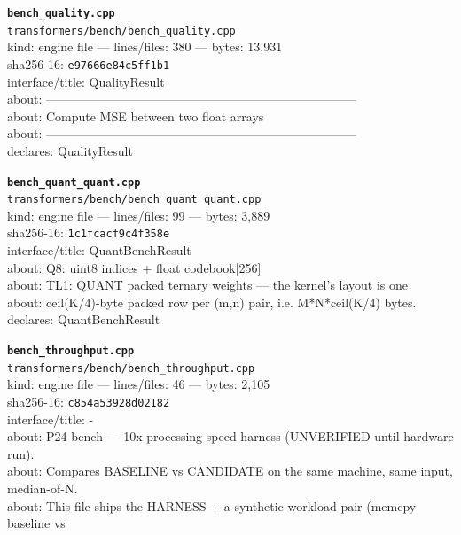 \noindent\textbf{\texttt{bench\_quality.cpp}}\\
\texttt{transformers/bench/bench\_quality.cpp}\\
kind: engine file --- lines/files: 380 --- bytes: 13,931\\
sha256-16: \texttt{e97666e84c5ff1b1}\\
interface/title: QualityResult\\
about: ---------------------------------------------------------------------------\\
about: Compute MSE between two float arrays\\
about: ---------------------------------------------------------------------------\\
declares: QualityResult\\
\vspace*{6.0pt}

\noindent\textbf{\texttt{bench\_quant\_quant.cpp}}\\
\texttt{transformers/bench/bench\_quant\_quant.cpp}\\
kind: engine file --- lines/files: 99 --- bytes: 3,889\\
sha256-16: \texttt{1c1fcacf9c4f358e}\\
interface/title: QuantBenchResult\\
about: Q8: uint8 indices + float codebook[256]\\
about: TL1: QUANT packed ternary weights — the kernel's layout is one\\
about: ceil(K/4)-byte packed row per (m,n) pair, i.e. M*N*ceil(K/4) bytes.\\
declares: QuantBenchResult\\
\vspace*{6.0pt}

\noindent\textbf{\texttt{bench\_throughput.cpp}}\\
\texttt{transformers/bench/bench\_throughput.cpp}\\
kind: engine file --- lines/files: 46 --- bytes: 2,105\\
sha256-16: \texttt{c854a53928d02182}\\
interface/title: -\\
about: P24 bench — 10x processing-speed harness (UNVERIFIED until hardware run).\\
about: Compares BASELINE vs CANDIDATE on the same machine, same input, median-of-N.\\
about: This file ships the HARNESS + a synthetic workload pair (memcpy baseline vs\\
\vspace*{6.0pt}
\newpage

